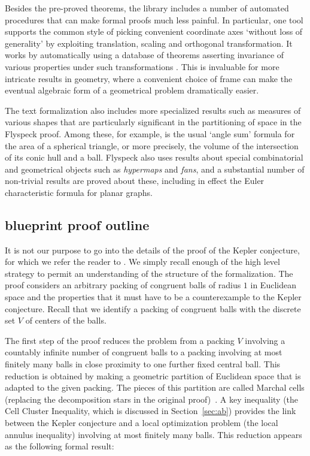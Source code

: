 Besides the pre-proved theorems, the library includes a number of
automated procedures that can make formal proofs much less painful. In
particular, one tool supports the common style of picking convenient
coordinate axes `without loss of generality' by exploiting
translation, scaling and orthogonal transformation. It works by
automatically using a database of theorems asserting invariance of
various properties under such transformations
\cite{harrison-wlog}. This is invaluable for more intricate results in
geometry, where a convenient choice of frame can make the eventual
algebraic form of a geometrical problem dramatically easier.

The text formalization also includes more specialized results such as
measures of various shapes that are particularly significant in the
partitioning of space in the Flyspeck proof. Among these, for example,
is the usual `angle sum' formula for the area of a spherical triangle,
or more precisely, the volume of the intersection of its conic hull
and a ball. Flyspeck also uses results about special combinatorial and
geometrical objects such as {\em hypermaps} and {\em fans}, and a
substantial number of non-trivial results are proved about these,
including in effect the Euler characteristic formula for planar
graphs.

\subsection{blueprint proof outline}

It is not our purpose to go into the details of the proof of the
Kepler conjecture, for which we refer the reader to \cite{DSP}.  We
simply recall enough of the high level strategy to permit an
understanding of the structure of the formalization.  The proof
considers an arbitrary packing of congruent balls of radius $1$ in
Euclidean space and the properties that it must have to be a
counterexample to the Kepler conjecture.  Recall that we identify a
packing of congruent balls with the discrete set $V$ of centers of the
balls.

The first step of the proof reduces the problem from a packing $V$
involving a countably infinite number of congruent balls to a packing
involving at most finitely many balls in close proximity to one further
fixed central ball.  This reduction is obtained by making a geometric
partition of Euclidean space that is adapted to the given packing.
The pieces of this partition are called Marchal cells (replacing the
decomposition stars in the original proof)~\cite{Marchal11}.  A key
inequality (the Cell Cluster Inequality, which is discussed in
Section~\ref{sec:ab}) provides the link between the Kepler conjecture
and a local optimization problem (the local annulus inequality)
involving at most finitely many balls.  This reduction appears as the
following formal result:

